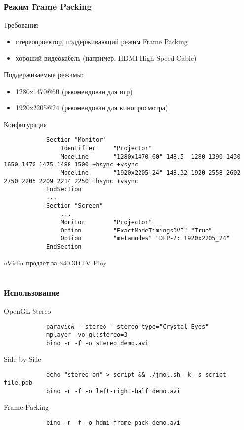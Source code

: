 \documentclass[ucs]{beamer}
\begin{document}
\begin{frame}[fragile]
	\frametitle{Режим Frame Packing}
	\begin{block}{Требования}
		\scriptsize
		\begin{itemize}
			\item стереопроектор, поддерживающий режим Frame Packing \\
			\item хороший видеокабель (например, HDMI High Speed Cable) \\
		\end{itemize}
		Поддерживаемые режимы:
		\begin{itemize}
			\item 1280x1470@60 (рекомендован для игр) \\
			\item 1920x2205@24 (рекомендован для кинопросмотра) \\
		\end{itemize}
	\end{block}
	\begin{block}{Конфигурация}
		\tiny
		\begin{verbatim}
			Section "Monitor"
			    Identifier     "Projector"
			    Modeline       "1280x1470_60" 148.5  1280 1390 1430 1650 1470 1475 1480 1500 +hsync +vsync
			    Modeline       "1920x2205_24" 148.32 1920 2558 2602 2750 2205 2209 2214 2250 +hsync +vsync
			EndSection
			...
			Section "Screen"
			    ...
			    Monitor        "Projector"
			    Option         "ExactModeTimingsDVI" "True"
			    Option         "metamodes" "DFP-2: 1920x2205_24"
			EndSection
		\end{verbatim}
	\end{block}
	\scriptsize
	nVidia продаёт за \$40 3DTV Play
\end{frame}

\section*{}
\begin{frame}[fragile]
	\frametitle{Использование}
	\scriptsize
	\begin{block}{OpenGL Stereo}
		\begin{verbatim}
			paraview --stereo --stereo-type="Crystal Eyes"
			mplayer -vo gl:stereo=3
			bino -n -f -o stereo demo.avi
		\end{verbatim}
	\end{block}
	\begin{block}{Side-by-Side}
		\begin{verbatim}
			echo "stereo on" > script && ./jmol.sh -k -s script file.pdb
			bino -n -f -o left-right-half demo.avi
		\end{verbatim}
	\end{block}
	\begin{block}{Frame Packing}
		\begin{verbatim}
			bino -n -f -o hdmi-frame-pack demo.avi
		\end{verbatim}
	\end{block}
\end{frame}
\end{document}
